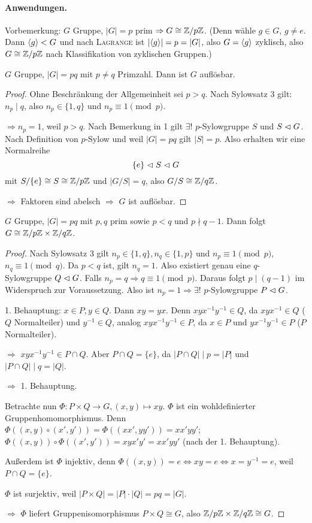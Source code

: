 \documentclass[12pt,a4paper]{scrartcl}
\begin{document}
\paragraph{Anwendungen.}\leavevmode
Vorbemerkung: $G$ Gruppe, $|G| = p$ prim $\Rightarrow G\cong \mathbb Z/p\mathbb Z$. (Denn wähle $g\in G$, $g\neq e$. Dann $\langle g\rangle <G$ und nach \textsc{Lagrange} ist $|\langle g\rangle| = p = |G|$, also $G = \langle g\rangle$ zyklisch, also $G\cong \mathbb Z/p\mathbb Z$ nach Klassifikation von zyklischen Gruppen.)
\begin{satz}[Satz 6.4]
	$G$ Gruppe, $|G| = pq$ mit $p\neq q$ Primzahl. Dann ist $G$ auflösbar.
\end{satz}	
\begin{proof}
	Ohne Beschränkung der Allgemeinheit sei $p>q$. Nach Sylowsatz 3 gilt: $n_p\mid q$, also $n_p\in\{1,q\}$ und $n_p\equiv 1 \pmod p$.
	
	$\Rightarrow n_p = 1$, weil $p>q$. Nach Bemerkung in 1 gilt $\exists!$ $p$-Sylowgruppe $S$ und $S\vartriangleleft G$. Nach Definition von $p$-Sylow und weil $|G| = pq$ gilt $|S| = p$. Also erhalten wir eine Normalreihe 
	$$ \{e\}\vartriangleleft S\vartriangleleft G$$ mit $S/\{e\}\cong S\cong \mathbb Z/p\mathbb Z$ und $|G/S| = q$, also $G/S\cong \mathbb Z/q\mathbb Z$.
	
	$\Rightarrow$ Faktoren sind abelsch $\Rightarrow$ $G$ ist auflösbar.
\end{proof}

\begin{satz}[Satz 6.5]
	$G$ Gruppe, $|G| = pq$ mit $p,q$ prim sowie $p<q$ und $p \nmid q-1$. Dann folgt $G\cong\mathbb Z/p\mathbb Z \times \mathbb Z/ q\mathbb Z$.
\end{satz}
\begin{proof}
	Nach Sylowsatz 3 gilt $n_p\in \{1,q\}, n_q\in\{1,p\}$ und $n_p\equiv 1\pmod p$, $n_q\equiv 1\pmod q$. Da $p<q$ ist, gilt $n_q = 1$. Also existiert genau eine $q$-Sylowgruppe $Q\vartriangleleft G$. Falls $n_p = q\Rightarrow q\equiv 1\pmod p$. Daraus folgt $p\mid (q-1)$ im Widerspruch zur Voraussetzung. Also ist $n_p = 1\Rightarrow \exists!$ $p$-Sylowgruppe $P\vartriangleleft G$.
	
	1. Behauptung: $x\in P ,y\in Q$. Dann $xy = yx$. Denn $xyx^{-1}y^{-1}\in Q$, da $xyx^{-1}\in Q$ ($Q$ Normalteiler) und $y^{-1}\in Q$, analog $xyx^{-1}y^{-1}\in P$, da $x\in P$ und $yx^{-1}y^{-1} \in P$ ($P$ Normalteiler).
	
	$\Rightarrow$ $xyx^{-1}y^{-1} \in P\cap Q$. Aber $P\cap Q = \{e\}$, da $|P\cap Q|\mid p = |P|$ und $|P\cap Q| \mid q = |Q|$.
	
	$\Rightarrow$ 1. Behauptung.
	
	Betrachte nun $\Phi\colon P\times Q\to G, (x,y)\mapsto xy$. $\Phi$ ist ein wohldefinierter Gruppenhomomorphismus. Denn $\Phi((x,y)\circ (x',y')) = \Phi ((xx', yy')) = xx'yy'$; $\Phi((x,y))\circ \Phi((x',y')) = xyx'y' = xx'yy'$ (nach der 1. Behauptung).
	
	Außerdem ist $\Phi$ injektiv, denn $\Phi((x,y)) = e\Leftrightarrow xy = e\Leftrightarrow x = y^{-1} = e$, weil $P\cap Q = \{e\}$.
	
	$\Phi$ ist surjektiv, weil $|P\times Q| = |P|\cdot |Q| = pq = |G|$.
	
	$\Rightarrow$ $\Phi$ liefert Gruppenisomorphismus $P\times Q \cong G$, also $\mathbb Z/p\mathbb Z\times \mathbb Z/q\mathbb Z\cong G$.
\end{proof}
\end{document}
